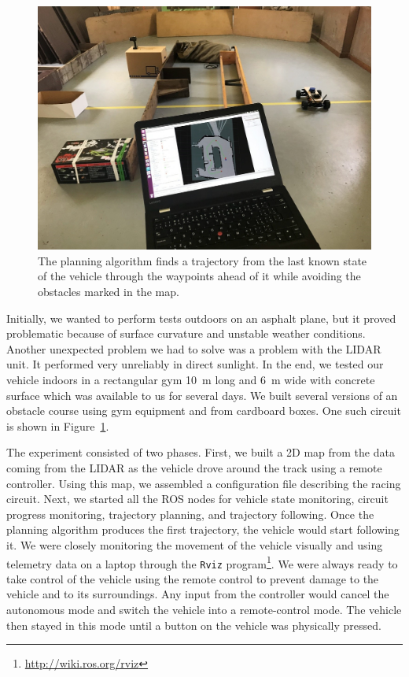 \begin{figure}
	\label{fig:real-world-testing-still}
	\centering
	\includegraphics[width=\textwidth]{../img/experiments/real-world-still.jpg}
	\caption{The planning algorithm finds a trajectory from the last known state of the vehicle through the waypoints ahead of it while avoiding the obstacles marked in the map.}
\end{figure}


Initially, we wanted to perform tests outdoors on an asphalt plane, but it proved problematic because of surface curvature and unstable weather conditions. Another unexpected problem we had to solve was a problem with the \gls*{LIDAR} unit. It performed very unreliably in direct sunlight. In the end, we tested our vehicle indoors in a rectangular gym \SI{10}{\meter} long and \SI{6}{\meter} wide with concrete surface which was available to us for several days. We built several versions of an obstacle course using gym equipment and from cardboard boxes. One such circuit is shown in Figure~\ref{fig:real-world-testing-still}.

The experiment consisted of two phases. First, we built a 2D map from the data coming from the \gls*{LIDAR} as the vehicle drove around the track using a remote controller. Using this map, we assembled a configuration file describing the racing circuit. Next, we started all the \gls{ROS} nodes for vehicle state monitoring, circuit progress monitoring, trajectory planning, and trajectory following. Once the planning algorithm produces the first trajectory, the vehicle would start following it. We were closely monitoring the movement of the vehicle visually and using telemetry data on a laptop through the \texttt{Rviz} program\footnote{\url{http://wiki.ros.org/rviz}}. We were always ready to take control of the vehicle using the remote control to prevent damage to the vehicle and to its surroundings. Any input from the controller would cancel the autonomous mode and switch the vehicle into a remote-control mode. The vehicle then stayed in this mode until a button on the vehicle was physically pressed.

